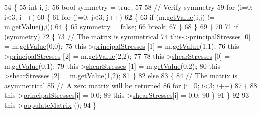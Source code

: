 \begin{DoxyCode}
54 \{
55   \textcolor{keywordtype}{int} i, j;
56   \textcolor{keywordtype}{bool} symmetry = \textcolor{keyword}{true};
57 
58   \textcolor{comment}{// Verify symmetry}
59   \textcolor{keywordflow}{for} (i=0; i<3; i++)
60     \{
61       \textcolor{keywordflow}{for} (j=0; j<3; j++)
62         \{
63           \textcolor{keywordflow}{if} (m.\hyperlink{classMatrix33_ab53b3e37ad830a87a804cf26311ba088}{getValue}(i,j) != m.\hyperlink{classMatrix33_ab53b3e37ad830a87a804cf26311ba088}{getValue}(j,i))
64             \{
65               symmetry = \textcolor{keyword}{false};
66               \textcolor{keywordflow}{break};
67             \}
68         \}
69     \}
70 
71   \textcolor{keywordflow}{if} (symmetry)
72     \{
73       \textcolor{comment}{// The matrix is symmetrical}
74       this->\hyperlink{classStress_aea8c3e40aa59a89d7ba79d2c916050a6}{principalStresses} [0] = m.\hyperlink{classMatrix33_ab53b3e37ad830a87a804cf26311ba088}{getValue}(0,0);
75       this->\hyperlink{classStress_aea8c3e40aa59a89d7ba79d2c916050a6}{principalStresses} [1] = m.\hyperlink{classMatrix33_ab53b3e37ad830a87a804cf26311ba088}{getValue}(1,1);
76       this->\hyperlink{classStress_aea8c3e40aa59a89d7ba79d2c916050a6}{principalStresses} [2] = m.\hyperlink{classMatrix33_ab53b3e37ad830a87a804cf26311ba088}{getValue}(2,2);
77 
78       this->\hyperlink{classStress_a77e8705e56c2fb56826a638edf3f78bf}{shearStresses} [0] = m.\hyperlink{classMatrix33_ab53b3e37ad830a87a804cf26311ba088}{getValue}(0,1);
79       this->\hyperlink{classStress_a77e8705e56c2fb56826a638edf3f78bf}{shearStresses} [1] = m.\hyperlink{classMatrix33_ab53b3e37ad830a87a804cf26311ba088}{getValue}(0,2);
80       this->\hyperlink{classStress_a77e8705e56c2fb56826a638edf3f78bf}{shearStresses} [2] = m.\hyperlink{classMatrix33_ab53b3e37ad830a87a804cf26311ba088}{getValue}(1,2);
81     \}
82   \textcolor{keywordflow}{else}
83     \{
84       \textcolor{comment}{// The matrix is asymmetrical}
85       \textcolor{comment}{// A zero matrix will be returned}
86       \textcolor{keywordflow}{for} (i=0; i<3; i++)
87         \{
88           this->\hyperlink{classStress_aea8c3e40aa59a89d7ba79d2c916050a6}{principalStresses}[i] = 0.0;
89           this->\hyperlink{classStress_a77e8705e56c2fb56826a638edf3f78bf}{shearStresses}[i] = 0.0;
90         \}
91     \}
92 
93   this->\hyperlink{classStress_aa395d5763df8feb4689e0c5524c9e562}{populateMatrix} ();
94 \}
\end{DoxyCode}


